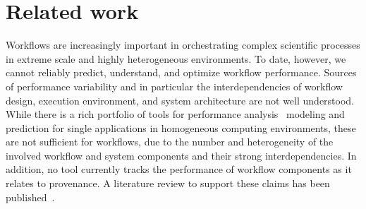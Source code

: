 \section{Related work}

Workflows are increasingly important in orchestrating complex scientific processes in extreme scale and highly heterogeneous environments. To date, however, we cannot reliably predict, understand, and optimize workflow performance. Sources of performance variability and in particular the interdependencies of workflow design, execution environment, and system architecture are not well understood. While there is a rich portfolio of tools for performance analysis~\cite{sonar, TAU, ScoreP, HPCToolkit} modeling and prediction for single applications in homogeneous computing environments, these are not sufficient for workflows, due to the number and heterogeneity of the involved workflow and system components and their strong interdependencies. In addition, no tool currently tracks the performance of workflow components as it relates to provenance. A literature review to support these claims has been published~\cite{kerstin2015design}. 

